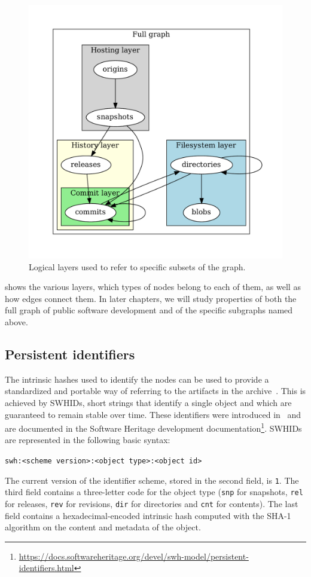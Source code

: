 \begin{figure}
    \centering
    \includegraphics[width=0.6\linewidth,trim=1cm 1cm 1cm 1cm]{img/swh-layers}
    \caption{Logical layers used to refer to specific subsets of the graph.}%
    \label{fig:layers}
\end{figure}
 shows the various layers, which types of nodes belong to
each of them, as well as how edges connect them. In later chapters, we will
study properties of both the full graph of public software development and of
the specific subgraphs named above.


\subsection{Persistent identifiers}%
\label{sec:swhid}

The intrinsic hashes used to identify the nodes can be used to provide a
standardized and portable way of referring to the artifacts in the
archive~\cite{swhipres2018}. This is achieved by \glspl{SWHID},
short strings that identify a single object and which are guaranteed to remain
stable over time.  These identifiers were introduced in~\cite{cise-2020-doi}
and are documented in the Software Heritage development
documentation\footnote{\url{https://docs.softwareheritage.org/devel/swh-model/persistent-identifiers.html}}.
\glspl{SWHID} are represented in the following basic syntax:

\texttt{swh:<scheme version>:<object type>:<object id>}

The current version of the identifier scheme, stored in the second field, is
\texttt{1}. The third field contains a three-letter code for the object type
(\texttt{snp} for snapshots, \texttt{rel} for releases, \texttt{rev} for
revisions, \texttt{dir} for directories and \texttt{cnt} for contents). The
last field contains a hexadecimal-encoded intrinsic hash computed with the
SHA-1 algorithm on the content and metadata of the object.

